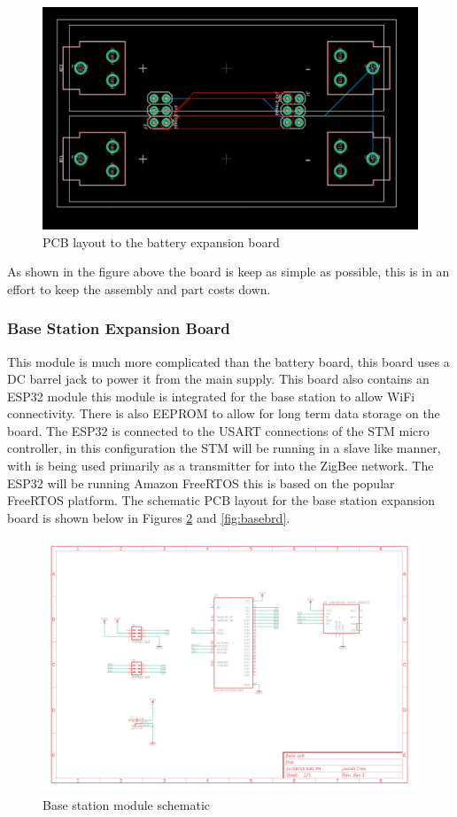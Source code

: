 \documentclass[12pt]{article}
\begin{document}
\begin{figure}[H]
\includegraphics[width=\textwidth]{battery-brd}
\caption{PCB layout to the battery expansion board}
\label{fig:batbrd}
\end{figure}

As shown in the figure above the board is keep as simple as possible, this is in an effort to
keep the assembly and part costs down. 

\subsubsection{Base Station Expansion Board}
This module is much more complicated than the battery board, this board uses a DC barrel jack to
power it from the main supply. This board also contains an ESP32 module this module is integrated
for the base station to allow WiFi connectivity. There is also EEPROM to allow for long term data
storage on the board. The ESP32 is connected to the USART connections of the STM micro 
controller, in this configuration the STM will be running in a slave like manner, with is being 
used primarily as a transmitter for into the ZigBee network. The ESP32 will be running Amazon 
FreeRTOS this is based on the popular FreeRTOS platform. The schematic PCB layout for the base 
station expansion board is shown below in Figures {\ref{fig:basesch}} and {\ref{fig:basebrd}}.

\begin{figure}[H]
\includegraphics[width=\textwidth]{base-sch}
\caption{Base station module schematic}
\label{fig:basesch}
\end{figure}
\end{document}
